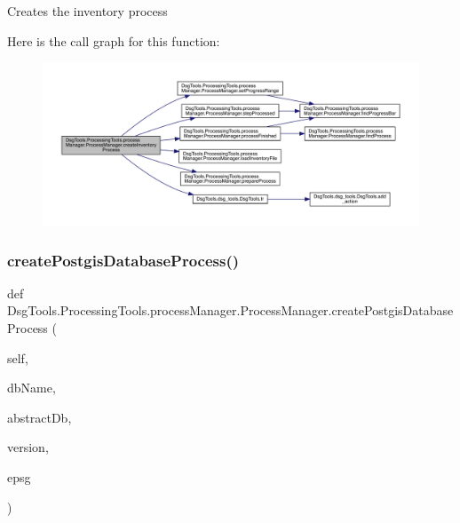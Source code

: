 \begin{DoxyVerb}Creates the inventory process
\end{DoxyVerb}
 Here is the call graph for this function\+:
\nopagebreak
\begin{figure}[H]
\begin{center}
\leavevmode
\includegraphics[width=350pt]{class_dsg_tools_1_1_processing_tools_1_1process_manager_1_1_process_manager_a28a26a3c90baa1c7416b92c2c34e44c7_cgraph}
\end{center}
\end{figure}
\mbox{\label{class_dsg_tools_1_1_processing_tools_1_1process_manager_1_1_process_manager_a0fb7d4b7632e7b9f848f616f0ca0efbe}} 
\subsubsection{\texorpdfstring{create\+Postgis\+Database\+Process()}{createPostgisDatabaseProcess()}}
{\footnotesize\ttfamily def Dsg\+Tools.\+Processing\+Tools.\+process\+Manager.\+Process\+Manager.\+create\+Postgis\+Database\+Process (\begin{DoxyParamCaption}\item[{}]{self,  }\item[{}]{db\+Name,  }\item[{}]{abstract\+Db,  }\item[{}]{version,  }\item[{}]{epsg }\end{DoxyParamCaption})}

